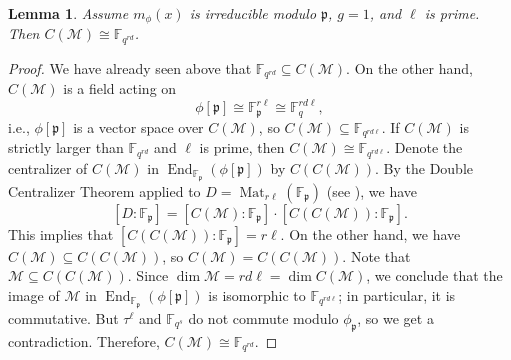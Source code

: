 \documentclass[12pt]{amsart}
\newtheorem{lem}[thm]{Lemma}
\theoremstyle{definition}
\theoremstyle{remark}
\numberwithin{equation}{section}
\numberwithin{thm}{section}
\DeclareMathOperator{\End}{End}
\DeclareMathOperator{\Mat}{Mat}
\newcommand{\fp}{\mathfrak{p}}
\newcommand{\cM}{\mathcal{M}}
\newcommand{\F}{\mathbb{F}}
\begin{document}

\begin{lem}\label{lemCentralizer}
    Assume $m_\phi(x)$ is irreducible modulo $\fp$, $g=1$, and $\ell$ is prime. Then $C(\cM)\cong \F_{q^{rd}}$. 
\end{lem}
\begin{proof}
    We have already seen above that $\F_{q^{rd}}\subseteq C(\cM)$. On the other hand, $C(\cM)$ is a field acting on \[\phi[\fp]\cong \F_{\fp}^{r\ell}\cong \F_q^{rd\ell},\] 
    i.e., $\phi[\fp]$ is a vector space over $C(\cM)$, so $C(\cM)\subseteq \F_{q^{rd\ell}}$. If $C(\cM)$ is strictly larger than 
    $\F_{q^{rd}}$ and $\ell$ is prime, then $C(\cM)\cong \F_{q^{rd\ell}}$. 
    Denote the centralizer of $C(\cM)$ in $\End_{\F_\fp}(\phi[\fp])$ by $C(C(\cM))$. By 
    the Double Centralizer Theorem applied to $D=\Mat_{r\ell}(\F_\fp)$ 
    (see \cite[Cor. 7.13]{Reiner}), we have 
    \[
    [D:\F_\fp] = [C(\cM):\F_\fp] \cdot [C(C(\cM)):\F_\fp]. 
    \]
    This implies that $[C(C(\cM)):\F_\fp]=r\ell$. On the other hand, we have $C(\cM)\subseteq C(C(\cM))$, so $C(\cM)= C(C(\cM))$. 
    Note that $\cM\subseteq C(C(\cM))$. Since $\dim \cM = rd\ell = \dim C(\cM)$, we conclude that the image of $\cM$ in $\End_{\F_\fp}(\phi[\fp])$ is isomorphic to $\F_{q^{rd\ell}}$; in particular, it is commutative. But $\tau^\ell$ and $\F_{q^s}$ do not commute modulo $\phi_\fp$, so we get a contradiction. Therefore, $C(\cM)\cong \F_{q^{rd}}$.
\end{proof}
\end{document}
